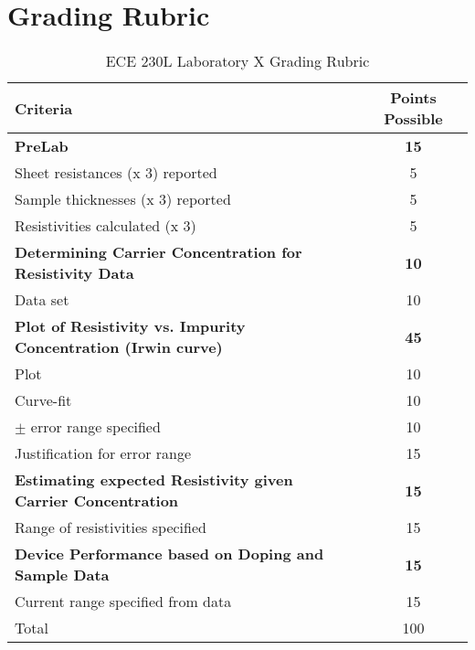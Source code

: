 \documentclass[12pt]{../manual}
\begin{document}
\section*{Grading Rubric}
\vfill
\begin{table}[ht!]
\caption{ECE 230L Laboratory X Grading Rubric}
\centering
\begin{tabular}{l|c} \hline
Criteria & Points Possible \\ \hline \hline
\textbf{PreLab}	& \textbf{15}\\ 
Sheet resistances (x 3) reported & 5 \\ 
Sample thicknesses (x 3) reported & 5 \\ 
Resistivities calculated (x 3) & 5 \\ \hline
\textbf{Determining Carrier Concentration for Resistivity Data} & \textbf{10} \\ 
Data set & 10 \\ \hline
\textbf{Plot of Resistivity vs. Impurity Concentration (Irwin curve)} & \textbf{45} \\ 
            Plot & 10 \\ 
            Curve-fit & 10 \\ 
            $\pm$ error range specified & 10\\ 
              Justification for error range	& 15 \\ \hline
\textbf{Estimating expected Resistivity given Carrier Concentration} & \textbf{15} \\ 
Range of resistivities specified & 15 \\ \hline
\textbf{Device Performance based on Doping and Sample Data} & \textbf{15} \\ 
              Current range specified from data & 15 \\ \hline \hline
Total	& 100 \\ \hline
\end{tabular}
\end{table}
\vfill
%
\end{document}
